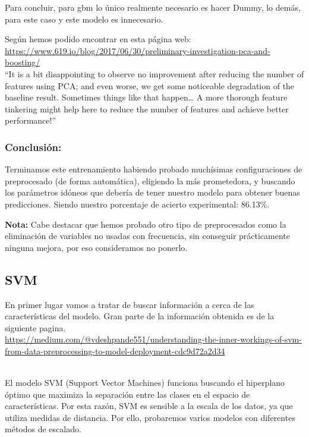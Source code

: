 \documentclass[
]{article}
\begin{document}
Para concluir, para gbm lo único realmente necesario es hacer Dummy, lo
demás, para este caso y este modelo es innecesario.

Según hemos podido encontrar en esta página web:
\url{https://www.619.io/blog/2017/06/30/preliminary-investigation-pca-and-boosting/}\\

``It is a bit disappointing to observe no improvement after reducing the
number of features using PCA; and even worse, we get some noticeable
degradation of the baseline result. Sometimes things like that
happen\ldots{} A more thorough feature tinkering might help here to
reduce the number of features and achieve better performance!''

\hypertarget{conclusiuxf3n}{%
\subsubsection{Conclusión:}\label{conclusiuxf3n}}

Terminamos este entrenamiento habiendo probado muchísimas
configuraciones de preprocesado (de forma automática), eligiendo la más
prometedora, y buscando los parámetros idóneos que debería de tener
nuestro modelo para obtener buenas predicciones. Siendo nuestro
porcentaje de acierto experimental: 86.13\%.

\textbf{Nota:} Cabe destacar que hemos probado otro tipo de
preprocesados como la eliminación de variables no usadas con frecuencia,
sin conseguir prácticamente ninguna mejora, por eso consideramos no
ponerlo.

\hypertarget{svm}{%
\subsection{SVM}\label{svm}}

En primer lugar vamos a tratar de buscar información a cerca de las
características del modelo. Gran parte de la información obtenida es de
la siguiente pagina.\\
\url{https://medium.com/@vdeshpande551/understanding-the-inner-workings-of-svm-from-data-preprocessing-to-model-deployment-cdc9d72a2d34}\strut \\
El modelo SVM (Support Vector Machines) funciona buscando el hiperplano
óptimo que maximiza la separación entre las clases en el espacio de
características. Por esta razón, SVM es sensible a la escala de los
datos, ya que utiliza medidas de distancia. Por ello, probaremos varios
modelos con diferentes métodos de escalado.
\end{document}
